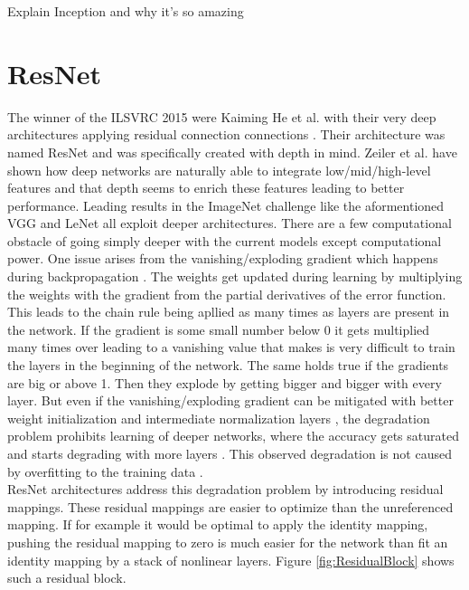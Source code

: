 Explain Inception and why it's so amazing

\section{ResNet}

The winner of the ILSVRC 2015 were Kaiming He et al. with their very deep architectures applying residual connection connections \cite{he2016deep, he2016identity}. Their architecture was named ResNet and was specifically created with depth in mind. Zeiler et al. have shown how deep networks are naturally able to integrate low/mid/high-level features and that depth seems to enrich these features leading to better performance. Leading results in the ImageNet challenge like the aformentioned VGG \cite{simonyan2014very} and LeNet \cite{szegedy2015going} all exploit deeper architectures. There are a few computational obstacle of going simply deeper with the current models except computational power. One issue arises from the vanishing/exploding gradient which happens during backpropagation \cite{glorot2010understanding}. The weights get updated during learning by multiplying the weights with the gradient from the partial derivatives of the error function. This leads to the chain rule being apllied as many times as layers are present in the network. If the gradient is some small number below 0 it gets multiplied many times over leading to a vanishing value that makes is very difficult to train the layers in the beginning of the network. The same holds true if the gradients are big or above 1. Then they explode by getting bigger and bigger with every layer. But even if the vanishing/exploding gradient can be mitigated with better weight initialization and intermediate normalization layers \cite{ioffe2015batch}, the degradation problem prohibits learning of deeper networks, where the accuracy gets saturated and starts degrading with more layers \cite{he2016deep}. This observed degradation is not caused by overfitting to the training data \cite{he2015convolutional, srivastava2015highway}.\\

ResNet architectures address this degradation problem by introducing residual mappings. These residual mappings are easier to optimize than the unreferenced mapping. If for example it would be optimal to apply the identity mapping, pushing the residual mapping to zero is much easier for the network than fit an identity mapping by a stack of nonlinear layers. Figure \ref{fig:ResidualBlock} shows such a residual block.

